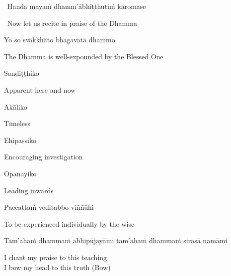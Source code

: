 \begin{leader}
  \anglebracketleft\ \hspace{-0.5mm}Handa mayaṁ dhamm'ābhitthutiṁ karomase \hspace{-0.5mm}\anglebracketright\
\end{leader}
\begin{leader-english-belowpali}
  \anglebracketleft\ \hspace{-0.5mm}Now let us recite in praise of the Dhamma \hspace{-0.5mm}\anglebracketright\
\end{leader-english-belowpali}

Yo so svākkhāto bhagavatā dhammo

\begin{english}
  The Dhamma is well-expounded by the Blessed One
\end{english}

Sandiṭṭhiko

\begin{english}
  Apparent here and now
\end{english}

Akāliko

\begin{english}
  Timeless
\end{english}

Ehipassiko

\begin{english}
  Encouraging investigation
\end{english}

Opanayiko

\begin{english}
  Leading inwards
\end{english}

Paccattaṁ veditabbo viññūhi

\begin{english}
  To be experienced individually by the wise
\end{english}

\suttaRef{[SN 12.41]}

\begin{pali-hang}
  Tam'ahaṁ dhammaṁ abhipūjayāmi tam'ahaṁ dhammaṁ sirasā namāmi
\end{pali-hang}

\begin{english}
  I chant my praise to this teaching\\
  I bow my head to this truth \hfill{\textnormal{\ifafiveversion\fontsize{12.5}{18}\fi\ifasixversion\fontsize{9}{13}\fi\selectfont (Bow)}}
\end{english}

